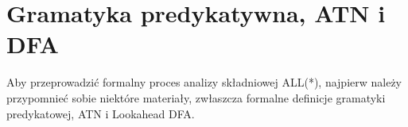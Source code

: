 \section{Gramatyka predykatywna, ATN i DFA}
Aby przeprowadzić formalny proces analizy składniowej ALL(*), najpierw należy przypomnieć sobie niektóre materiały, zwłaszcza formalne definicje gramatyki predykatowej, ATN i Lookahead DFA.
